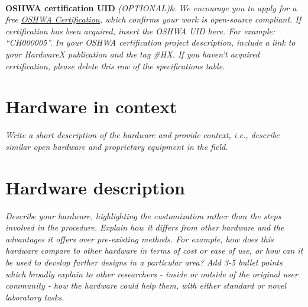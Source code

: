 \documentclass[11pt, letterpaper]{article}
\begin{document}
\begin{flushleft}
\begin{tabu}
  \\
\hline \textbf{OSHWA certification UID} \vskip 0.1cm {\it (OPTIONAL)}&
{\it We encourage you to apply for a free \href{https://certification.oshwa.org/}{\underline{OSHWA Certification}}, which confirms your work is open-source compliant.
\vskip 0.2cm
If certification has been acquired, insert the OSHWA UID here. For example: “CH000005”. In your OSHWA certification project description, include a link to your HardwareX publication and the tag \#HX.
\vskip 0.2cm
If you haven’t acquired certification, please delete this row of the specifications table.}
\\\hline
\end{tabu}
\end{flushleft}
\newpage
\section{Hardware in context}
\textit{Write a short description of the hardware and provide context, i.e., describe similar open hardware and proprietary equipment in the field.}
\section{Hardware description}


\textit{Describe your hardware, highlighting the customization rather than the steps involved in the procedure. Explain how it differs from other hardware and the advantages it offers over pre-existing methods. For example, how does this hardware compare to other hardware in terms of cost or ease of use, or how can it be used to develop further designs in a particular area? 
\vskip 0.3cm \noindent
Add 3-5 bullet points which broadly explain to other researchers - inside or outside of the original user community - how the hardware could help them, with either standard or novel laboratory tasks.}
\end{document}
